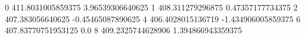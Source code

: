 0 411.8031005859375 3.96539306640625
1 408.311279296875 0.47357177734375
2 407.383056640625 -0.45465087890625
4 406.4028015136719 -1.434906005859375
6 407.83770751953125 0.0
8 409.2325744628906 1.394866943359375

